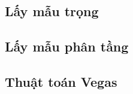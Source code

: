 \subsection{Lấy mẫu trọng}\label{subsec:3.2.1}
\subsection{Lấy mẫu phân tầng}\label{subsec:3.2.2}
\subsection{Thuật toán Vegas}\label{subsec:3.2.3}
